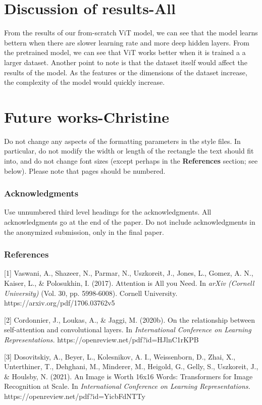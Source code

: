 \documentclass{article} %
\begin{document}
\section{Discussion of results-All}
From the results of our from-scratch ViT model, we can see that the model learns bettern
when there are slower learning rate and  more deep hidden layers. 
From the pretrained model, we can see that ViT works better when it is trained a a larger 
dataset.
Another point to note is that the dataset itself would affect the results of the model. As the 
features or the dimensions of the dataset increase, the complexity of the model would quickly increase.  


\section{Future works-Christine}


Do not change any aspects of the formatting parameters in the style files.
In particular, do not modify the width or length of the rectangle the text
should fit into, and do not change font sizes (except perhaps in the
\textbf{References} section; see below). Please note that pages should be
numbered.

\subsubsection*{Acknowledgments}

Use unnumbered third level headings for the acknowledgments. All
acknowledgments go at the end of the paper. Do not include 
acknowledgments in the anonymized submission, only in the 
final paper. 

\subsubsection*{References}

\small{
[1] Vaswani, A., Shazeer, N., Parmar, N., Uszkoreit, J., Jones, L., 
Gomez, A. N., Kaiser, L., \& Polosukhin, I. (2017). Attention is All 
you Need. In {\it arXiv (Cornell University)} (Vol. 30, pp. 5998-6008). 
Cornell University. https://arxiv.org/pdf/1706.03762v5

[2] Cordonnier, J., Loukas, A., \& Jaggi, M. (2020b). On the 
relationship between self-attention and convolutional layers. In {\it International 
Conference on Learning Representations.} https://openreview.net/pdf?id=HJlnC1rKPB

[3] Dosovitskiy, A., Beyer, L., Kolesnikov, A. I., Weissenborn, D., Zhai, X., 
Unterthiner, T., Dehghani, M., Minderer, M., Heigold, G., Gelly, S., Uszkoreit, 
J., \& Houlsby, N. (2021). An Image is Worth 16x16 Words: Transformers for Image 
Recognition at Scale. In {\it International Conference on Learning Representations.}
https://openreview.net/pdf?id=YicbFdNTTy

}
\end{document}

